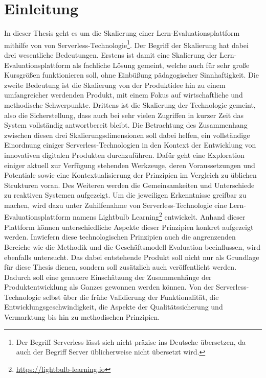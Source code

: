 \chapter{Einleitung}

In dieser Thesis geht es um die Skalierung einer Lern-Evaluationsplattform mithilfe von von Serverless-Technologie\footnote{Der Begriff Serverless lässt sich nicht präzise ins Deutsche übersetzen, da auch der Begriff Server üblicherweise nicht übersetzt wird.}. Der Begriff der Skalierung hat dabei drei wesentliche Bedeutungen. Erstens ist damit eine Skalierung der Lern-Evaluationsplattform als fachliche Lösung gemeint, welche auch für sehr große Kursgrößen funktionieren soll, ohne Einbüßung pädagogischer Sinnhaftigkeit. Die zweite Bedeutung ist die Skalierung von der Produktidee hin zu einem umfangreicher werdenden Produkt, mit einem Fokus auf wirtschaftliche und methodische Schwerpunkte. Drittens ist die Skalierung der Technologie gemeint, also die Sicherstellung, dass auch bei sehr vielen Zugriffen in kurzer Zeit das System vollständig antwortbereit bleibt. Die Betrachtung des Zusammenhang zwischen diesen drei Skalierungsdimensionen soll dabei helfen, ein vollständige Einordnung einiger Serverless-Technologien in den Kontext der Entwicklung von innovativen digitalen Produkten durchzuführen. Dafür geht eine Exploration einiger aktuell zur Verfügung stehenden Werkzeuge, deren Voraussetzungen und Potentiale sowie eine Kontextualisierung der Prinzipien im Vergleich zu üblichen Strukturen voran. Des Weiteren werden die Gemeinsamkeiten und Unterschiede zu reaktiven Systemen aufgezeigt. Um die jeweiligen Erkenntnisse greifbar zu machen, wird dazu unter Zuhilfenahme von Serverless-Technologie eine Lern-Evaluationsplattform namens Lightbulb Learning\footnote{\url{https://lightbulb-learning.io}} entwickelt. Anhand dieser Plattform können unterschiedliche Aspekte dieser Prinzipien konkret aufgezeigt werden. Inwiefern diese technologischen Prinzipien auch die angrenzenden Bereiche wie die Methodik und die Geschäftsmodell-Evaluation beeinflussen, wird ebenfalls untersucht. Das dabei entstehende Produkt soll nicht nur als Grundlage für diese Thesis dienen, sondern soll zusätzlich auch veröffentlicht werden. Dadurch soll eine genauere Einschätzung der Zusammenhänge der Produktentwicklung als Ganzes gewonnen werden können. Von der Serverless-Technologie selbst über die frühe Validierung der Funktionalität, die Entwicklungsgeschwindigkeit, die Aspekte der Qualitätssicherung und Vermarktung bis hin zu methodischen Prinzipien.